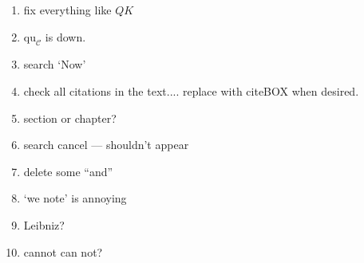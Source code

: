 \documentclass[11pt]{amsart} \renewcommand{\baselinestretch}{1.2}
\theoremstyle{plain}
\numberwithin{equation}{section} %
\theoremstyle{plain}
\numberwithin{equation}{chapter} %
\renewcommand{\to}{\longrightarrow}
\newcommand{\calc}{\mathcal{C}}
\newcommand{\quadratic}{\mathrm{qu}}
\begin{document}
\begin{todolist}
\begin{enumerate}
\item fix everything like $QK$
\item $\quadratic_\calc$ is down.
\item search `Now'
\item check all citations in the text.... replace with citeBOX when desired.
\item section or chapter?
\item search cancel --- shouldn't appear
\item delete some ``and''
\item `we note' is annoying
\item Leibniz?
\item cannot can not?
\end{enumerate}
\end{todolist}
\begin{bibliog}
\printbibliography
\end{bibliog}
\end{document}
